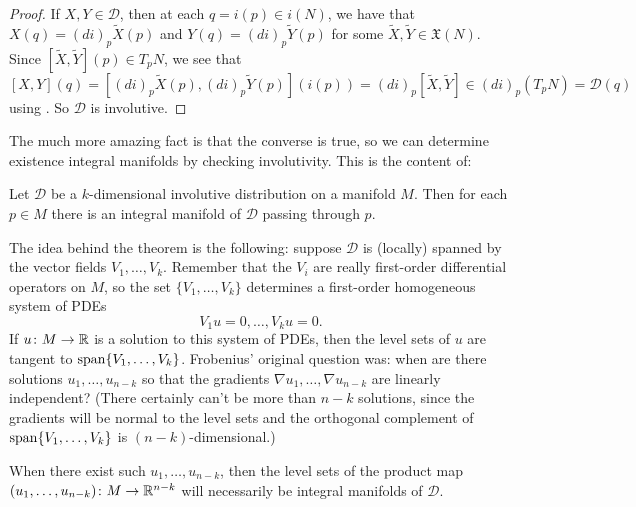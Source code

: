 \begin{proof}
	If $X,Y \in \mathcal{D}$, then at each $q = i(p) \in i(N)$, we have that $X(q) = (di)_p \widetilde{X}(p)$ and $Y(q) = (di)_p \widetilde{Y}(p)$ for some $\widetilde{X}, \widetilde{Y} \in \mathfrak{X}(N)$. Since $[\widetilde{X}, \widetilde{Y}](p) \in T_pN$, we see that
	\[
		[X,Y](q) = [(di)_p \widetilde{X}(p),(di)_p \widetilde{Y}(p)](i(p)) = (di)_p [\widetilde{X},\widetilde{Y}] \in (di)_p(T_pN) = \mathcal{D}(q)
	\]
	using . So $\mathcal{D}$ is involutive.
\end{proof}

The much more amazing fact is that the converse is true, so we can determine existence integral manifolds by checking involutivity. This is the content of:

\begin{theorem}\label{thm:Frobenius}
	Let $\mathcal{D}$ be a $k$-dimensional involutive distribution on a manifold $M$. Then for each $p \in M$ there is an integral manifold of $\mathcal{D}$ passing through $p$.
\end{theorem}

The idea behind the theorem is the following: suppose $\mathcal{D}$ is (locally) spanned by the vector fields $V_1, \dots , V_k$. Remember that the $V_i$ are really first-order differential operators on $M$, so the set $\{V_1, \dots , V_k\}$ determines a first-order homogeneous system of PDEs
\[
	V_1 u = 0 , \dots , V_k u = 0.
\]
If $u \colon\thinspace\! M \to \mathbb{R}$ is a solution to this system of PDEs, then the level sets of $u$ are tangent to $\operatorname{span} \{V_1, \dots , V_k\}$. Frobenius' original question was: when are there solutions $u_1, \dots , u_{n-k}$ so that the gradients $\nabla u_1, \dots , \nabla u_{n-k}$ are linearly independent? (There certainly can't be more than $n-k$ solutions, since the gradients will be normal to the level sets and the orthogonal complement of $\operatorname{span} \{V_1, \dots , V_k\}$ is $(n-k)$-dimensional.)

When there exist such $u_1, \dots , u_{n-k}$, then the level sets of the product map $(u_1, \dots , u_{n-k}) \colon\thinspace\! M \to \mathbb{R}^{n-k}$ will necessarily be integral manifolds of $\mathcal{D}$.

